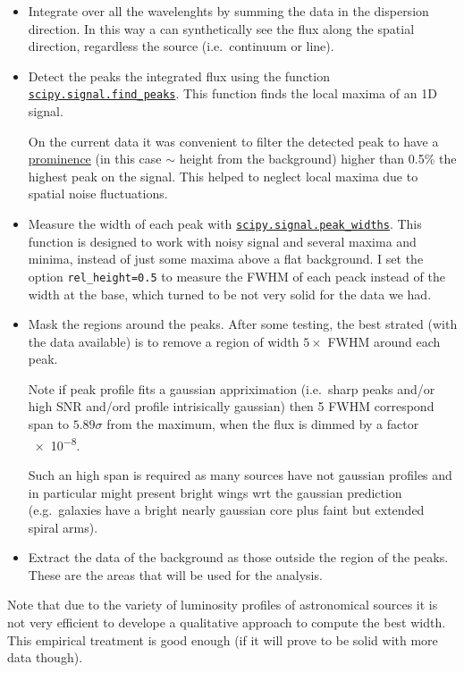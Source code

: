 \documentclass{article}
\begin{document}
\begin{itemize}
	\item Integrate over all the wavelenghts by summing the data in the dispersion direction. In this way a can synthetically see the flux along the spatial direction, regardless the source (i.e.\ continuum or line).
	\item Detect the peaks the integrated flux using the function \href{https://docs.scipy.org/doc/scipy/reference/generated/scipy.signal.find_peaks.html}{\texttt{scipy.signal.find\_peaks}}. This function finds the local maxima of an 1D signal.
	
	On the current data it was convenient to filter the detected peak to have a \href{https://en.wikipedia.org/wiki/Topographic_prominence}{prominence} (in this case $\sim$ height from the background) higher than 0.5\% the highest peak on the signal. This helped to neglect local maxima due to spatial noise fluctuations.
	
	\item Measure the width of each peak with \href{https://docs.scipy.org/doc/scipy/reference/generated/scipy.signal.peak_widths.html#scipy.signal.peak_widths}{\texttt{scipy.signal.peak\_widths}}. This function is designed to work with noisy signal and several maxima and minima, instead of just some maxima above a flat background. I set the option \texttt{rel\_height=0.5} to measure the FWHM of each peack instead of the width at the base, which turned to be not very solid for the data we had.
	
	\item Mask the regions around the peaks. After some testing, the best strated (with the data available) is to remove a region of width $ 5\times$ FWHM around each peak.
	
	Note if peak profile fits a gaussian appriximation (i.e.\ sharp peaks and/or high SNR and/ord profile intrisically gaussian) then 5 FWHM correspond span to $5.89\sigma$ from the maximum, when the flux is dimmed by a factor \num{e-8}.
	
	Such an high span is required as many sources have not gaussian profiles and in particular might present bright wings wrt the gaussian prediction (e.g.\ galaxies have a bright nearly gaussian core plus faint but extended spiral arms).
	
	\item Extract the data of the background as those outside the region of the peaks. These are the areas that will be used for the analysis.
\end{itemize}
Note that due to the variety of luminosity profiles of astronomical sources it is not very efficient to develope a qualitative approach to compute the best width. This empirical treatment is good enough (if it will prove to be solid with more data though).
\end{document}
